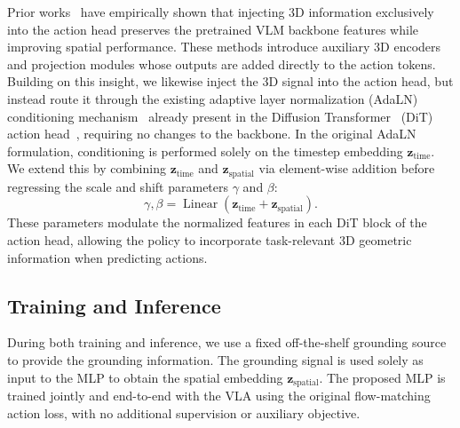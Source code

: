 Prior works~\cite{pointvla, falcon} have empirically shown that injecting 3D information exclusively into the action head preserves the pretrained VLM backbone features while improving spatial performance. These methods introduce auxiliary 3D encoders and projection modules whose outputs are added directly to the action tokens. Building on this insight, we likewise inject the 3D signal into the action head, but instead route it through the existing adaptive layer normalization (AdaLN) conditioning mechanism~\cite{DiT, perez2018film} already present in the Diffusion Transformer~\cite{DiT} (DiT) action head~\cite{li2024cogact, pi0, pi05, gr00tn1_2025, molmobot}, requiring no changes to the backbone. In the original AdaLN formulation, conditioning is performed solely on the timestep embedding $\mathbf{z}_\text{time}$. We extend this by combining $\mathbf{z}_\text{time}$ and $\mathbf{z}_\text{spatial}$ via element-wise addition before regressing the scale and shift parameters $\gamma$ and $\beta$:
\begin{equation}
    \gamma, \beta = \operatorname{Linear}(\mathbf{z}_\text{time} + \mathbf{z}_\text{spatial}).
\end{equation}
These parameters modulate the normalized features in each DiT block of the action head, allowing the policy to incorporate task-relevant 3D geometric information when predicting actions. 

\subsection{Training and Inference}
During both training and inference, we use a fixed off-the-shelf grounding source to provide the grounding information. The grounding signal is used solely as input to the MLP to obtain the spatial embedding $\mathbf{z}_\text{spatial}$. The proposed MLP is trained jointly and end-to-end with the VLA using the original flow-matching action loss, with no additional supervision or auxiliary objective.